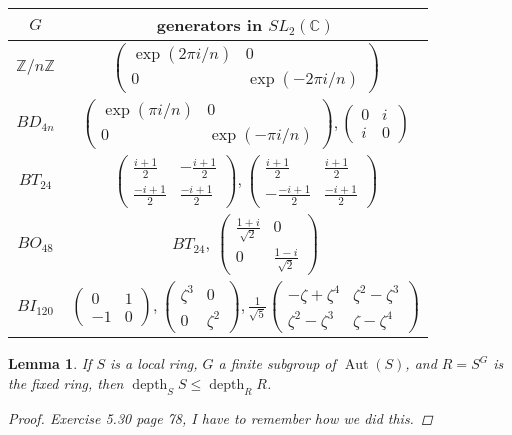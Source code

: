 \documentclass[11pt, a4paper, english]{article}
\numberwithin{prop}{section}
\newtheorem{lemma}{Lemma}
\numberwithin{lemma}{section}
\numberwithin{theorem}{section}
\numberwithin{defin}{section}
\numberwithin{example}{section}
\newcommand{\C}{\mathbb{C}}
\DeclareMathOperator{\Aut}{Aut}
\DeclareMathOperator{\depth}{depth}
\begin{document}
{\renewcommand{\arraystretch}{2}
\begin{tabular}{|c|c|}
\hline
$G$ & generators in $SL_2(\C)$
\\
\hline
\hline
$\mathbb{Z}/n\mathbb{Z}$ & $\begin{pmatrix}
\exp(2\pi i/n) & 0\\
0 & \exp(-2\pi i/n)
\end{pmatrix} $\\
\hline
$BD_{4n}$ &  $ \begin{pmatrix}
\exp(\pi i/n) & 0\\
0 & \exp(-\pi i/n)
\end{pmatrix}, \begin{pmatrix}
0 & i\\
i & 0
\end{pmatrix} $\\
\hline
$BT_{24}$ & $ \begin{pmatrix}
\frac{i+1}{2} & -\frac{i+1}{2}\\
\frac{-i+1}{2} & \frac{-i+1}{2}
\end{pmatrix}, \begin{pmatrix}
\frac{i+1}{2} & \frac{i+1}{2}\\
-\frac{-i+1}{2} & \frac{-i+1}{2}
\end{pmatrix} $\\
\hline
$BO_{48}$ & $BT_{24}$, $\begin{pmatrix}
\frac{1+i}{\sqrt{2}} & 0\\
0 & \frac{1-i}{\sqrt{2}}
\end{pmatrix}$\\
\hline
$BI_{120}$ & $ \begin{pmatrix}
0 & 1\\
-1 & 0
\end{pmatrix}, \begin{pmatrix}
\zeta^3 & 0\\
0 & \zeta^2
\end{pmatrix}, \frac{1}{\sqrt{5}}\begin{pmatrix}
-\zeta + \zeta^4 & \zeta^2 - \zeta^3\\
\zeta^2 - \zeta^3 & \zeta - \zeta^4
\end{pmatrix}$
\\
\hline
\end{tabular}
}

\begin{lemma}
\label{lem:depth_of_S_less_than_R}
If $S$ is a local ring, $G$ a finite subgroup of $\Aut(S)$, and $R=S^G$ is the fixed ring, then $\depth_SS \leq \depth_RR$.
\begin{proof}
{\color{red} Exercise 5.30 page 78, I have to remember how we did this.}
\end{proof}
\end{lemma}
\end{document}
